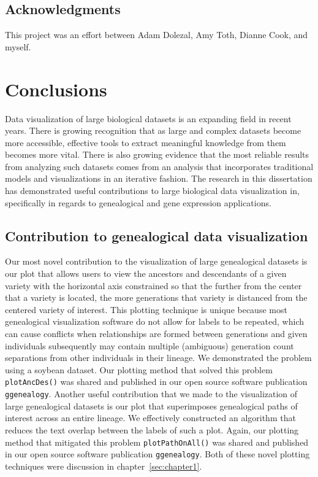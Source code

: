 \documentclass[11pt,a4paper,oldfontcommands,openany]{memoir}
\numberwithin{equation}{section} %
\newcommand{\code}[1]{{\texttt{#1}}}
\newcommand{\pkg}[1]{{\texttt{#1}}}
\begin{document}
\section{Acknowledgments}

This project was an effort between Adam Dolezal, Amy Toth, Dianne Cook, and myself.


\chapter{Conclusions}

Data visualization of large biological datasets is an expanding field in recent years. There is growing recognition that as large and complex datasets become more accessible, effective tools to extract meaningful knowledge from them becomes more vital. There is also growing evidence that the most reliable results from analyzing such datasets comes from an analysis that incorporates traditional models and visualizations in an iterative fashion. The research in this dissertation has demonstrated useful contributions to large biological data visualization in, specifically in regards to genealogical and gene expression applications. 

\section{Contribution to genealogical data visualization}

Our most novel contribution to the visualization of large genealogical datasets is our plot that allows users to view the ancestors and descendants of a given variety with the horizontal axis constrained so that the further from the center that a variety is located, the more generations that variety is distanced from the centered variety of interest. This plotting technique is unique because most genealogical visualization software do not allow for labels to be repeated, which can cause conflicts when relationships are formed between generations and given individuals subsequently may contain multiple (ambiguous) generation count separations from other individuals in their lineage. We demonstrated the problem using a soybean dataset. Our plotting method that solved this problem \code{plotAncDes()} was shared and published in our open source software publication \pkg{ggenealogy}. Another useful contribution that we made to the visualization of large genealogical datasets is our plot that superimposes genealogical paths of interest across an entire lineage. We effectively constructed an algorithm that reduces the text overlap between the labels of such a plot. Again, our plotting method that mitigated this problem \code{plotPathOnAll()} was shared and published in our open source software publication \pkg{ggenealogy}. Both of these novel plotting techniques were discussion in chapter~\ref{sec:chapter1}.
\end{document}
